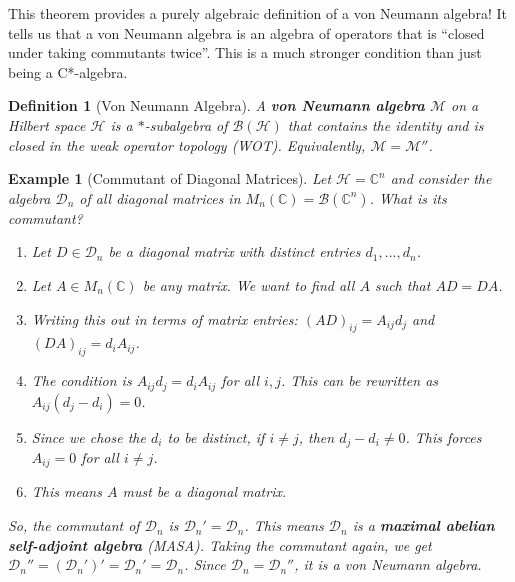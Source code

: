\documentclass[11pt, a4paper]{article}
\theoremstyle{colored_def}
\newtheorem{definition}{Definition}[section]
\theoremstyle{colored_thm}
\theoremstyle{colored_ex}
\newtheorem{example}{Example}[section]
\newcommand{\C}{\mathbb{C}}
\newcommand{\M}{\mathcal{M}}
\newcommand{\Hil}{\mathcal{H}}
\newcommand{\B}{\mathcal{B}}
\begin{document}
This theorem provides a purely algebraic definition of a von Neumann algebra! It tells us that a von Neumann algebra is an algebra of operators that is ``closed under taking commutants twice''. This is a much stronger condition than just being a C*-algebra.

\begin{definition}[Von Neumann Algebra]
A \textbf{von Neumann algebra} $\M$ on a Hilbert space $\Hil$ is a $*$-subalgebra of $\B(\Hil)$ that contains the identity and is closed in the weak operator topology (WOT). Equivalently, $\M = \M''$.
\end{definition}

\begin{example}[Commutant of Diagonal Matrices]\label{ex:commutant-diagonal}
Let $\Hil = \C^n$ and consider the algebra $\mathcal{D}_n$ of all diagonal matrices in $M_n(\C) = \B(\C^n)$. What is its commutant?
\begin{enumerate}
    \item Let $D \in \mathcal{D}_n$ be a diagonal matrix with distinct entries $d_1, \dots, d_n$.
    \item Let $A \in M_n(\C)$ be any matrix. We want to find all $A$ such that $AD = DA$.
    \item Writing this out in terms of matrix entries: $(AD)_{ij} = A_{ij}d_j$ and $(DA)_{ij} = d_i A_{ij}$.
    \item The condition is $A_{ij}d_j = d_i A_{ij}$ for all $i,j$. This can be rewritten as $A_{ij}(d_j - d_i) = 0$.
    \item Since we chose the $d_i$ to be distinct, if $i \neq j$, then $d_j - d_i \neq 0$. This forces $A_{ij} = 0$ for all $i \neq j$.
    \item This means $A$ must be a diagonal matrix.
\end{enumerate}
So, the commutant of $\mathcal{D}_n$ is $\mathcal{D}_n' = \mathcal{D}_n$. This means $\mathcal{D}_n$ is a \textbf{maximal abelian self-adjoint algebra} (MASA). Taking the commutant again, we get $\mathcal{D}_n'' = (\mathcal{D}_n')' = \mathcal{D}_n' = \mathcal{D}_n$. Since $\mathcal{D}_n = \mathcal{D}_n''$, it is a von Neumann algebra.
\end{example}
\end{document}
